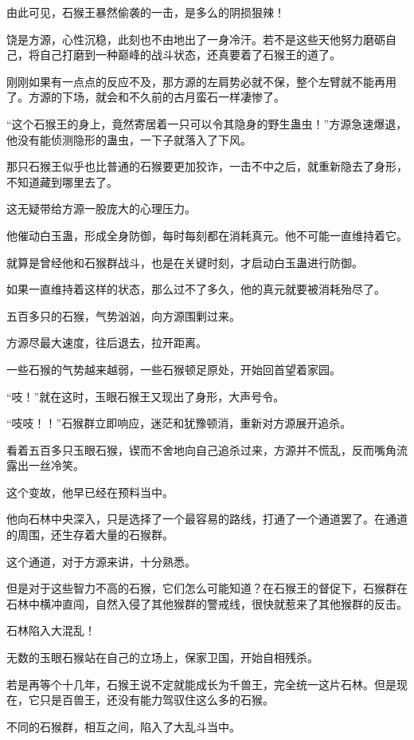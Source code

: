 \begin{this_body}
由此可见，石猴王暴然偷袭的一击，是多么的阴损狠辣！

饶是方源，心性沉稳，此刻也不由地出了一身冷汗。若不是这些天他努力磨砺自己，将自己打磨到一种巅峰的战斗状态，还真要着了石猴王的道了。

刚刚如果有一点点的反应不及，那方源的左肩势必就不保，整个左臂就不能再用了。方源的下场，就会和不久前的古月蛮石一样凄惨了。

“这个石猴王的身上，竟然寄居着一只可以令其隐身的野生蛊虫！”方源急速爆退，他没有能侦测隐形的蛊虫，一下子就落入了下风。

那只石猴王似乎也比普通的石猴要更加狡诈，一击不中之后，就重新隐去了身形，不知道藏到哪里去了。

这无疑带给方源一股庞大的心理压力。

他催动白玉蛊，形成全身防御，每时每刻都在消耗真元。他不可能一直维持着它。

就算是曾经他和石猴群战斗，也是在关键时刻，才启动白玉蛊进行防御。

如果一直维持着这样的状态，那么过不了多久，他的真元就要被消耗殆尽了。

五百多只的石猴，气势汹汹，向方源围剿过来。

方源尽最大速度，往后退去，拉开距离。

一些石猴的气势越来越弱，一些石猴顿足原处，开始回首望着家园。

“吱！”就在这时，玉眼石猴王又现出了身形，大声号令。

“吱吱！！”石猴群立即响应，迷茫和犹豫顿消，重新对方源展开追杀。

看着五百多只玉眼石猴，锲而不舍地向自己追杀过来，方源并不慌乱，反而嘴角流露出一丝冷笑。

这个变故，他早已经在预料当中。

他向石林中央深入，只是选择了一个最容易的路线，打通了一个通道罢了。在通道的周围，还生存着大量的石猴群。

这个通道，对于方源来讲，十分熟悉。

但是对于这些智力不高的石猴，它们怎么可能知道？在石猴王的督促下，石猴群在石林中横冲直闯，自然入侵了其他猴群的警戒线，很快就惹来了其他猴群的反击。

石林陷入大混乱！

无数的玉眼石猴站在自己的立场上，保家卫国，开始自相残杀。

若是再等个十几年，石猴王说不定就能成长为千兽王，完全统一这片石林。但是现在，它只是百兽王，还没有能力驾驭住这么多的石猴。

不同的石猴群，相互之间，陷入了大乱斗当中。


\end{this_body}
